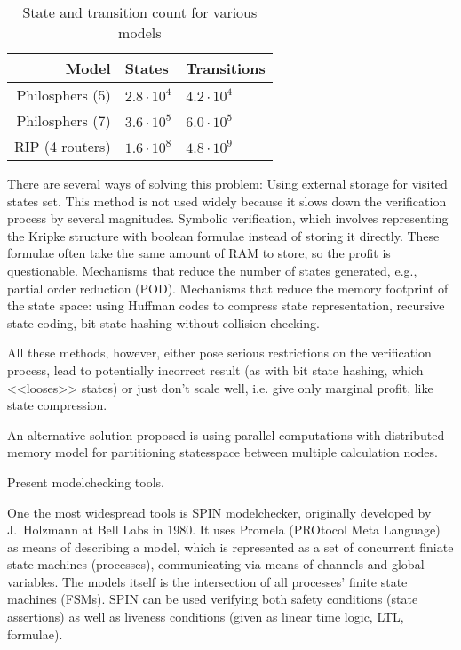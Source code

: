\begin{table}
  \centering
  \begin{tabular}{|r|l|l|}
    \hline
    Model                  & States         & Transitions       \\
    \hline
    Philosphers (5)            & $2.8 \cdot 10^4$  & $4.2 \cdot 10^4$ \\
    Philosphers (7)            & $3.6 \cdot 10^5$  & $6.0 \cdot 10^5$ \\
    RIP (4 routers)  & $1.6 \cdot 10^8$  & $4.8 \cdot 10^9$ \\
    \hline
  \end{tabular}
  \caption{State and transition count for various models}
\label{tab:models-statecount}

There are several ways of solving this problem:
Using external storage for visited states set. This method is not used widely because it
slows down the verification process by several magnitudes.
Symbolic verification, which involves representing the Kripke structure with boolean
formulae instead of storing it directly. These formulae often take the same amount of RAM
to store, so the profit is questionable.
Mechanisms that reduce the number of states generated, e.g., partial order reduction
(POD).
Mechanisms that reduce the memory footprint of the state space: using Huffman codes to
compress state representation, recursive state coding, bit state hashing without collision checking.

All these methods, however, either pose serious restrictions on the verification process,
lead to potentially incorrect result (as with bit state hashing, which <<looses>> states)
or just don't scale well, i.e. give only marginal profit, like state compression.

An alternative solution proposed is using parallel computations with distributed memory
model for partitioning statesspace between multiple calculation nodes.

Present modelchecking tools.

One the most widespread tools is SPIN modelchecker, originally developed by J.~Holzmann at
Bell Labs in 1980. It uses Promela (PROtocol Meta Language) as means of describing a
model, which is represented as a set of concurrent finiate state machines (processes), communicating via means of
channels and global variables. The models itself is the intersection of all processes'
finite state machines (FSMs). SPIN can be used verifying both safety conditions (state
assertions) as well as liveness conditions (given as linear time logic, LTL, formulae).


\end{table}
